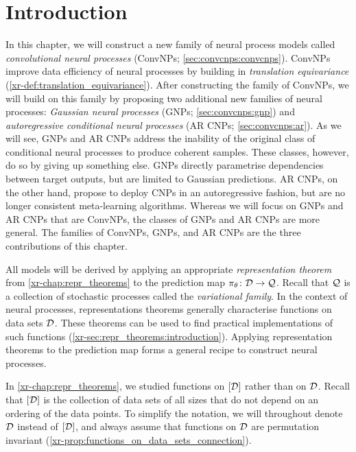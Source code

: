 \documentclass[12pt]{report}
\newcommand{\xrprefix}[1]{xr-#1}
\begin{document}
\section{Introduction}
\label{sec:convcnps:introduction}

In this chapter, we will construct a new family of neural process models called \emph{convolutional neural processes} (ConvNPs; \cref{sec:convcnps:convcnps}).
ConvNPs improve data efficiency of neural processes by building in \emph{translation equivariance} (\cref{\xrprefix{def:translation_equivariance}}).
%
After constructing the family of ConvNPs, we will build on this family 
by proposing two additional new families of neural processes:
\emph{Gaussian neural processes} (GNPs; \cref{sec:convcnps:gnp})
and \emph{autoregressive conditional neural processes} (AR CNPs; \cref{sec:convcnps:ar}).
As we will see,
GNPs and AR CNPs address the inability of the original class of conditional neural processes \parencite[CNPs;][]{Garnelo:2018:Conditional_Neural_Processes} to produce coherent samples.
These classes, however, do so by giving up something else.
GNPs
directly parametrise dependencies between target outputs,
but are limited to Gaussian predictions.
AR CNPs, on the other hand, propose to deploy CNPs in an autoregressive fashion, but are no longer consistent meta-learning algorithms.
Whereas we will focus on GNPs and AR CNPs that are ConvNPs, the classes of GNPs and AR CNPs are more general.
The families of ConvNPs, GNPs, and AR CNPs are the three contributions of this chapter.

All models will be derived by applying an appropriate \emph{representation theorem} from \cref{\xrprefix{chap:repr_theorems}} to the prediction map $\pi_\theta \colon \mathcal{D} \to \mathcal{Q}$.
Recall that $\mathcal{Q}$ is a collection of stochastic processes called the \emph{variational family}.
In the context of neural processes, representations theorems generally characterise functions on data sets $\mathcal{D}$.
These theorems can be used to find practical implementations of such functions (\cref{\xrprefix{sec:repr_theorems:introduction}}).
Applying representation theorems to the prediction map forms a general recipe to construct neural processes.

In \cref{\xrprefix{chap:repr_theorems}}, we studied functions on $[\mathcal{D}]$ rather than on $\mathcal{D}$.
Recall that $[\mathcal{D}]$ is the collection of data sets of all sizes that do not depend on an ordering of the data points.
To simplify the notation, we will throughout denote $\mathcal{D}$ instead of $[\mathcal{D}]$, and always assume that functions on $\mathcal{D}$ are permutation invariant (\cref{\xrprefix{prop:functions_on_data_sets_connection}}).
\end{document}

